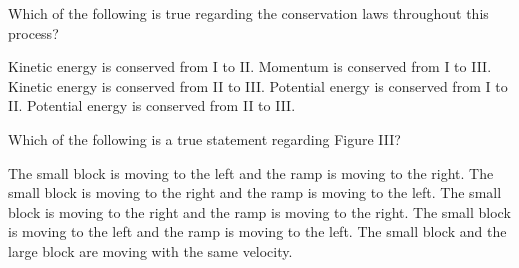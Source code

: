 \documentclass{../../../oss-apphys-exam}
\begin{document}
\begin{questions}
  
  \question Which of the following is true regarding the conservation laws
  throughout this process?
  \label{ramps1}
  \begin{choices}
    \choice Kinetic energy is conserved from I to II.
    \choice Momentum is conserved from I to III.
    \choice Kinetic energy is conserved from II to III.
    \choice Potential energy is conserved from I to II.
    \choice Potential energy is conserved from II to III.
  \end{choices}
    
  \question Which of the following is a true statement regarding Figure III?
  \label{ramps2}
  \begin{choices}
    \choice The small block is moving to the left and the ramp is moving to
    the right.
    \choice The small block is moving to the right and the ramp is moving
    to the left.
    \choice The small block is moving to the right and the ramp is moving
    to the right.
    \choice The small block is moving to the left and the ramp is moving to
    the left.
    \choice The small block and the large block are moving with the same
    velocity.
  \end{choices}
    
%
%
%    
    

\end{questions}
\end{document}
